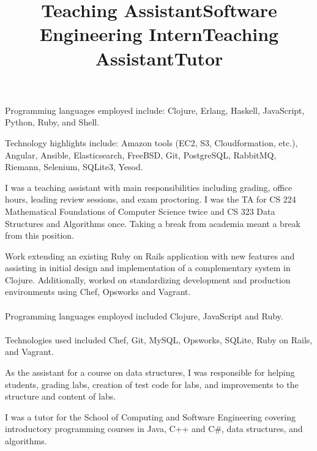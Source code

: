\documentclass[margintitle,line]{res}
\begin{document}
\begin{resume}
\begin{position}
  Programming languages employed include:
  Clojure, Erlang, Haskell, JavaScript, Python, Ruby, and Shell.

  Technology highlights include: Amazon tools (EC2, S3, Cloudformation, etc.),
  Angular, Ansible, Elasticsearch, FreeBSD, Git, PostgreSQL, RabbitMQ, Riemann,
  Selenium, SQLite3, Yesod.
\end{position}

\title{Teaching Assistant}
\begin{position}
 I was a teaching assistant with main responsibilities including
 grading, office hours, leading review sessions, and exam
 proctoring. I was the TA for CS 224 Mathematical Foundations of
 Computer Science twice and CS 323 Data Structures and Algorithms
 once. Taking a break from academia meant a break from this position.
\end{position}

\title{Software Engineering Intern}
\begin{position}
 Work extending an existing Ruby on Rails application with new
 features and assisting in initial design and implementation of a
 complementary system in  Clojure. Additionally, worked on
 standardizing development and production environments using Chef,
 Opsworks and Vagrant. \\ \ \\
 Programming languages employed included Clojure, JavaScript and Ruby. \\ \ \\
 Technologies used included Chef, Git, MySQL, Opsworks, SQLite,
 Ruby on Rails, and Vagrant.
\end{position}

\title{Teaching Assistant}
\begin{position}
 As the assistant for a course on data structures, I was responsible
 for helping students, grading labs, creation of test code for labs,
 and improvements to the structure and content of labs.
\end{position}

\title{Tutor}
\begin{position}
I was a tutor for the School of Computing and Software Engineering
covering introductory programming courses in Java, C++ and C\#, data
structures, and algorithms.
\end{position}


\end{resume}
\end{document}
